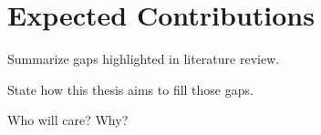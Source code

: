 
\section{Expected Contributions}

Summarize gaps highlighted in literature review.

State how this thesis aims to fill those gaps.

Who will care? Why?
